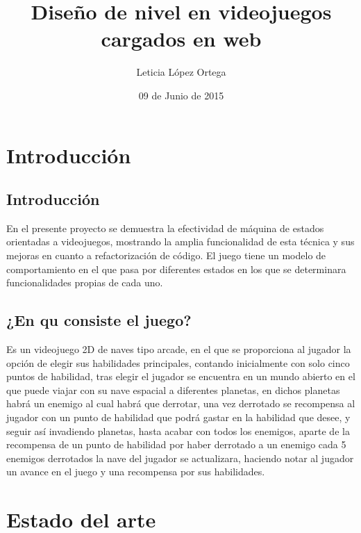 \documentclass[a4paper,10pt]{article}
\title{Diseño de nivel en videojuegos cargados en web}
\author{Leticia López Ortega}
\date{09 de Junio de 2015}
\begin{document}
\maketitle

\cleardoublepage
\tableofcontents 
\cleardoublepage

\listoffigures
\cleardoublepage

\listoftables
\cleardoublepage



\section{Introducción}

\subsection{Introducción}
En el presente proyecto se demuestra la efectividad de máquina de estados orientadas a videojuegos,
mostrando la amplia funcionalidad de esta técnica y sus mejoras en cuanto a refactorización
de código. El juego tiene un modelo de comportamiento en el que pasa por diferentes estados
en los que se determinara funcionalidades propias de cada uno.

\subsection{¿En qu consiste el juego?}
Es un videojuego 2D de naves tipo arcade, en el que se proporciona al jugador la opción de
elegir sus habilidades principales, contando inicialmente con solo cinco puntos de habilidad,
tras elegir el jugador se encuentra en un mundo abierto en el que puede viajar con su nave
espacial a diferentes planetas, en dichos planetas habrá un enemigo al cual habrá que
derrotar, una vez derrotado se recompensa al jugador con un punto de habilidad que podrá
gastar en la habilidad que desee, y seguir así invadiendo planetas, hasta acabar con todos los
enemigos, aparte de la recompensa de un punto de habilidad por haber derrotado a un
enemigo cada 5 enemigos derrotados la nave del jugador se actualizara, haciendo notar al
jugador un avance en el juego y una recompensa por sus habilidades.

\cleardoublepage

\section{Estado del arte}
\end{document}
